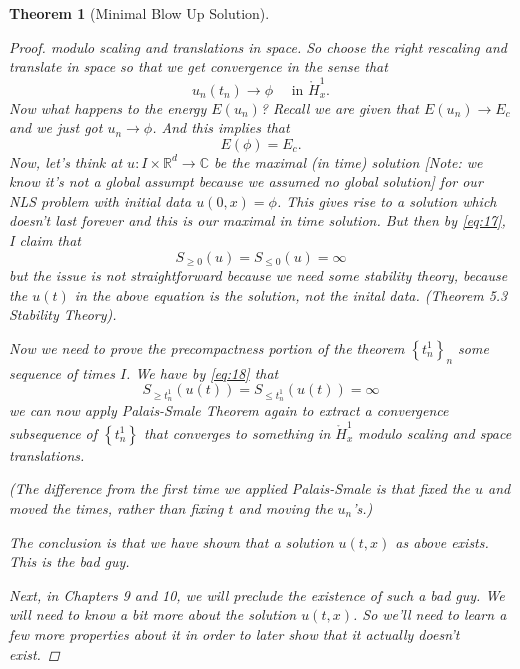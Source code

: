 \documentclass{article}
\newtheorem{theorem}{Theorem}
\def\R{\mathbb{R}} %
\begin{document}
\begin{theorem}[Minimal Blow Up Solution]
\begin{proof}
    modulo scaling and translations in space. So choose the right rescaling and
    translate in space so that we get convergence in the sense that
    \begin{equation*}
      u_{n}(t_{n}) \to \phi \quad \text{ in } \mathring{H}_{x}^{1}. 
    \end{equation*}
    Now what happens to the energy $E(u_{n})$? Recall we are given that
    $E(u_{n}) \to E_{c}$  and we just got $u_{n} \to \phi$. And this implies
    that
    \begin{equation*}
      E(\phi) = E_{c}.
    \end{equation*}
    Now, let's think at $u: I\times \R^{d} \to \mathbb{C}$ be the maximal (in
    time) solution [Note: we know it's not a global assumpt because we assumed
    no global solution] for our NLS problem with initial data $u(0,x)=\phi$.
    This gives rise to a solution which doesn't last forever and this is our
    maximal in time solution. But then by \cref{eq:17}, I claim that
    \begin{equation}\label{eq:18}
      S_{ \geq 0}(u) = S_{ \leq 0}(u) = \infty
    \end{equation}
    but the issue is not straightforward because we need some stability theory,
    because the $u(t)$ in the above equation is the solution, not the inital
    data.  (Theorem 5.3 Stability Theory).

    Now we need to prove the precompactness portion of the theorem
    $\left\{t_{n}^{1}\right\}_{n}$ some sequence of times $I$.  We have by
    \cref{eq:18} that
    \begin{equation*}
      S_{ \geq t^{1}_{n}} (u(t)) = S_{ \leq t^{1}_{n}}(u(t))= \infty
    \end{equation*}
    we can now apply Palais-Smale Theorem again to extract a convergence
    subsequence of $\left\{ t^{1}_{n} \right\}$ that converges to something in
    $\mathring{H}_{x}^{1}$ modulo scaling and space translations.
    
    (The difference from the first time we applied Palais-Smale is that fixed
    the $u$ and moved the times, rather than fixing $t$ and moving the
    $u_{n}$'s.)

    The conclusion is that we have shown that a solution $u(t,x)$ as above
    exists. This is the bad guy.

    Next, in Chapters 9 and 10, we will preclude the existence of such a bad
    guy. We will need to know a bit more about the solution $u(t,x)$. So we'll
    need to learn a few more properties about it in order to later show that it
    actually doesn't exist.


\end{proof}
\end{theorem}
\end{document}
